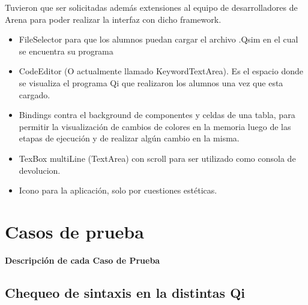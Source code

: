 Tuvieron que ser solicitadas además extensiones al equipo de desarrolladores de Arena para poder realizar la interfaz con dicho framework.

\begin{itemize}
\item FileSelector para que los alumnos puedan cargar el archivo .Qsim en el cual se encuentra su programa
\item CodeEditor (O actualmente llamado KeywordTextArea). Es el espacio donde se visualiza el programa Qi que realizaron los alumnos una vez que esta cargado.
\item Bindings contra el background de componentes y celdas de una tabla, para permitir la visualización de cambios de colores en la memoria luego de las etapas de ejecución y de realizar algún cambio en la misma.
\item TexBox multiLine (TextArea) con scroll para ser utilizado como consola de devolucion.
\item Icono para la aplicación, solo por cuestiones estéticas.
\end{itemize}

\section{Casos de prueba}

\textbf{Descripción de cada Caso de Prueba}

\subsection{Chequeo de sintaxis en la distintas Qi}

